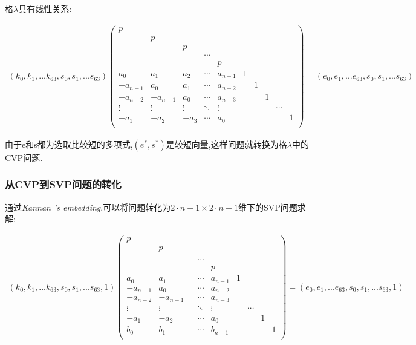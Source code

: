 \documentclass[12pt,a4paper]{article}
\newcommand{\supercite}[2][]{\textsuperscript{\citep[#1]{#2}}}
\numberwithin{equation}{section}
\begin{document}
格$\lambda$具有线性关系:

\begin{align}
	(k_0,k_1,...k_{63},s_0,s_1,...s_{63})
	\left(
	\begin{smallmatrix}
			p\\
			&p\\
			&&p\\
			&&&\cdots\\
			&&&&p\\
			a_0    &a_1    &a_2   &\cdots &a_{n-1}            &1\\
			-a_{n-1}&a_0    &a_1   &\cdots &a_{n-2}       &&1\\
			-a_{n-2}&-a_{n-1}&a_0   &\cdots &a_{n-3}  &&&1\\
			\vdots &\vdots &\vdots&\ddots &\vdots             &&&&\cdots\\
			-a_1    &-a_2    &-a_3   &\cdots &a_0 &&&&&1\\
		\end{smallmatrix}
	\right)
	=
	(e_0,e_1,...e_{63},s_0,s_1,...s_{63})
\end{align}

由于e和s都为选取比较短的多项式,$(e^*,s^*)$是较短向量,这样问题就转换为格$\lambda$中的CVP问题.

\subsubsection{从CVP到SVP问题的转化}
通过\textit{Kannan 's embedding}\supercite[]{kannan1987},可以将问题转化为$2 \cdot n+1 \times 2 \cdot n+1$维下的SVP问题求解:

\begin{align}
	(k_0,k_1,...k_{63},s_0,s_1,...s_{63},1)
	\left(
	\begin{smallmatrix}
			p\\
			&p\\
			&&\\
			&&&\cdots\\
			&&&&p\\
			a_0    &a_1    &   &\cdots &a_{n-1}            &1\\
			-a_{n-1}&a_0    &   &\cdots &a_{n-2}       &&\\
			-a_{n-2}&-a_{n-1}&   &\cdots &a_{n-3}  &&\\
			\vdots &\vdots &&\ddots &\vdots             &&\cdots\\
			-a_1    &-a_2    &   &\cdots &a_0 &&&1\\
			b_0    &b_1    &   &\cdots &b_{n-1}&&&&1\\
		\end{smallmatrix}
	\right)
	=
	(e_0,e_1,...e_{63},s_0,s_1,...s_{63},1)
\end{align}
\end{document}
